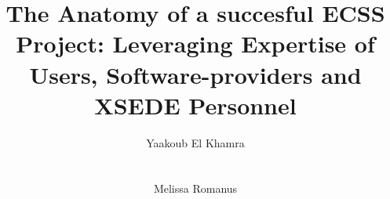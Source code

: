 \documentclass{sig-alternate}
\begin{document}
 {}
\crdata{}


\title{The Anatomy of a succesful ECSS Project: Leveraging Expertise
  of Users, Software-providers and XSEDE Personnel}

\author{
\alignauthor Yaakoub El Khamra\\
       \\
        \\
       \email{}
\alignauthor Melissa Romanus\\
       \\
        \\
       \email{}
}

\maketitle


\begin{abstract}
\end{abstract}


\newif\ifdraft 
\drafttrue 
\ifdraft
\newcommand{\mrnote}[1]{{\textcolor{green} { ***MR: #1 }}}
\newcommand{\jhanote}[1]{ {\textcolor{red} { ***SJ: #1 }}}
\newcommand{\yyenote}[1]{ {\textcolor{cyan} { ***YYE: #1 }}}
\newcommand{\pmnote}[1]{ {\textcolor{blue} { ***PM: #1 }}}
\newcommand{\todo}[1]{ {\textcolor{red} { ***TODO: #1 }}}
\newcommand{\fix}[1]{ {\textcolor{red} { ***FIX: #1 }}}
\newcommand{\reviewer}[1]{} \else \newcommand{\yyenote}[1]{}
\newcommand{\mrmnote}[1]{} \newcommand{\pmnote}[1]{}
\newcommand{\jhanote}[1]{} \newcommand{\todo}[1]{ {\textcolor{red} {
      ***TODO: #1 }}} \newcommand{\fix}[1]{} \fi
\end{document}
